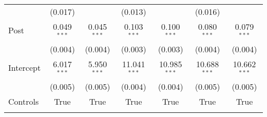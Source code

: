 \begin{tabular}{@{\extracolsep{5pt}}lcccccc}
                        & (0.017)                                                              &                   & (0.013)           &                   & (0.016)           &                   \\
    Post                & 0.049$^{***}$                                                        & 0.045$^{***}$     & 0.103$^{***}$     & 0.100$^{***}$     & 0.080$^{***}$     & 0.079$^{***}$     \\
                        & (0.004)                                                              & (0.004)           & (0.003)           & (0.003)           & (0.004)           & (0.004)           \\
    Intercept           & 6.017$^{***}$                                                        & 5.950$^{***}$     & 11.041$^{***}$    & 10.985$^{***}$    & 10.688$^{***}$    & 10.662$^{***}$    \\
                        & (0.005)                                                              & (0.005)           & (0.004)           & (0.004)           & (0.005)           & (0.005)           \\
    Controls            & True                                                                 & True              & True              & True              & True              & True              \\
    \hline                                                                                                                                                                                         \\[-1.8ex]

\end{tabular}
